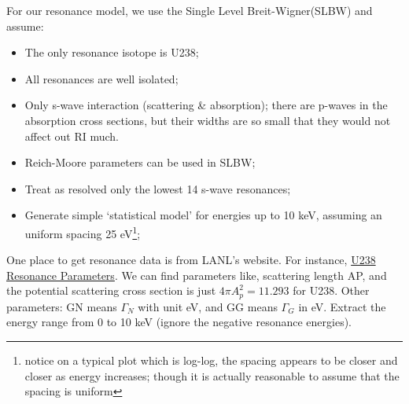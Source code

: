 \documentclass{school-22.211-notes}
\begin{document}
\clearpage
{}
For our resonance model, we use the Single Level Breit-Wigner(SLBW) and assume:
\begin{itemize}
  \item The only resonance isotope is U238;
  \item All resonances are well isolated;
  \item Only s-wave interaction (scattering \& absorption); there are p-waves in the absorption cross sections, but their widths are so small that they would not affect out RI much. 
  \item Reich-Moore parameters can be used in SLBW;
  \item Treat as resolved only the lowest 14 s-wave resonances;
  \item Generate simple `statistical model' for energies up to 10 keV, assuming an uniform spacing 25 eV\footnote{notice on a typical plot which is log-log, the spacing appears to be closer and closer as energy increases; though it is actually reasonable to assume that the spacing is uniform};
\end{itemize}
One place to get resonance data is from LANL's website. For instance, \href{http://t2.lanl.gov/cgi-bin/endf?2,151,/inet/WWW/data/data/ENDFB-VII-neutron/U/238}{U238 Resonance Parameters}. We can find parameters like, scattering length AP, and the potential scattering cross section is just $4 \pi A_p^2 = 11.293$ for U238. Other parameters: GN means $\Gamma_N$ with unit eV, and GG means $\Gamma_G$ in eV. Extract the energy range from 0 to 10 keV (ignore the negative resonance energies). 
\end{document}
